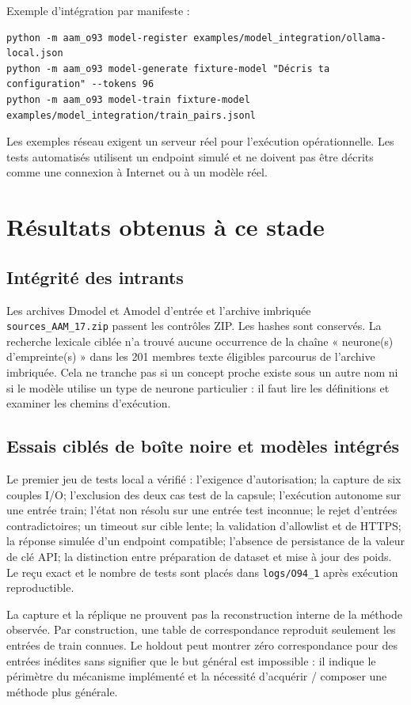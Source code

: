 \documentclass[11pt,a4paper]{article}
\begin{document}
Exemple d'intégration par manifeste :
\begin{verbatim}
python -m aam_o93 model-register examples/model_integration/ollama-local.json
python -m aam_o93 model-generate fixture-model "Décris ta configuration" --tokens 96
python -m aam_o93 model-train fixture-model examples/model_integration/train_pairs.jsonl
\end{verbatim}
Les exemples réseau exigent un serveur réel pour l'exécution opérationnelle. Les tests automatisés utilisent un endpoint simulé et ne doivent pas être décrits comme une connexion à Internet ou à un modèle réel.

\section{Résultats obtenus à ce stade}
\subsection{Intégrité des intrants}
Les archives Dmodel et Amodel d'entrée et l'archive imbriquée \texttt{sources\_AAM\_17.zip} passent les contrôles ZIP. Les hashes sont conservés. La recherche lexicale ciblée n'a trouvé aucune occurrence de la chaîne « neurone(s) d'empreinte(s) » dans les 201 membres texte éligibles parcourus de l'archive imbriquée. Cela ne tranche pas si un concept proche existe sous un autre nom ni si le modèle utilise un type de neurone particulier : il faut lire les définitions et examiner les chemins d'exécution.

\subsection{Essais ciblés de boîte noire et modèles intégrés}
Le premier jeu de tests local a vérifié : l'exigence d'autorisation; la capture de six couples I/O; l'exclusion des deux cas test de la capsule; l'exécution autonome sur une entrée train; l'état non résolu sur une entrée test inconnue; le rejet d'entrées contradictoires; un timeout sur cible lente; la validation d'allowlist et de HTTPS; la réponse simulée d'un endpoint compatible; l'absence de persistance de la valeur de clé API; la distinction entre préparation de dataset et mise à jour des poids. Le reçu exact et le nombre de tests sont placés dans \texttt{logs/O94\_1} après exécution reproductible.

La capture et la réplique ne prouvent pas la reconstruction interne de la méthode observée. Par construction, une table de correspondance reproduit seulement les entrées de train connues. Le holdout peut montrer zéro correspondance pour des entrées inédites sans signifier que le but général est impossible : il indique le périmètre du mécanisme implémenté et la nécessité d'acquérir / composer une méthode plus générale.
\end{document}
